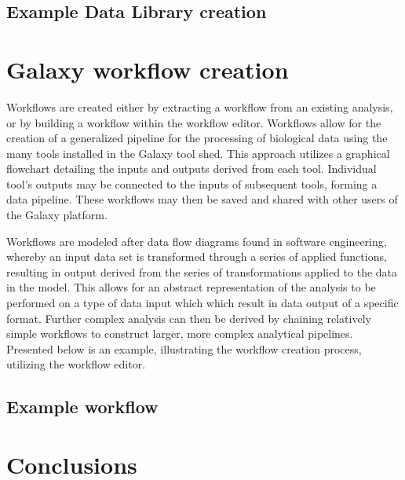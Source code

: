 \documentclass[a4paper,10pt]{article}
\begin{document}
\subsection{Example Data Library creation}
\section{Galaxy workflow creation}
Workflows are created either by extracting a workflow from an existing analysis, or by building a workflow within the workflow editor.  Workflows allow for the creation of a generalized pipeline for the processing of biological data using the many tools installed in the Galaxy tool shed.  This approach utilizes a graphical flowchart detailing the inputs and outputs derived from each tool.  Individual tool's outputs may be connected to the inputs of subsequent tools, forming a data pipeline.  These workflows may then be saved and shared with other users of the Galaxy platform.

Workflows are modeled after data flow diagrams found in software engineering, whereby an input data set is transformed through a series of applied functions, resulting in output derived from the series of transformations applied to the data in the model.  This allows for an abstract representation of the analysis to be performed on a type of data input which which result in data output of a specific format.  Further complex analysis can then be derived by chaining relatively simple workflows to construct larger, more complex analytical pipelines.  Presented below is an example, illustrating the workflow creation process, utilizing the workflow editor.
\subsection{Example workflow}
\section{Conclusions}
\end{document}

